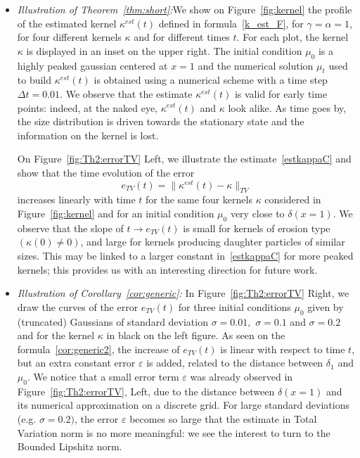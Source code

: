 \documentclass[AHL,Unicode,longabstracts,published]{cedram}
\newcommand*\eps{\varepsilon}
\begin{document}
\begin{itemize}
\item \emph{Illustration of Theorem~\ref{thm:short}:\;}We show on Figure~\ref{fig:kernel} the profile of the estimated kernel $\kappa^{est}(t)$ defined in formula~\eqref{k_est_F}, for $\gamma=\alpha=1$, for four different kernels $\kappa$ and for different times $t$. For each plot, the kernel $\kappa$ is displayed in an inset on the upper right. The initial condition $\mu_0$ is a highly peaked gaussian centered at $x=1$ and the numerical solution $\mu_t$ used to build $\kappa^{est}(t)$ is obtained using a numerical scheme with a time step $\Delta t=0.01$. We observe that the estimate $\kappa^{est}(t)$ is valid for early time points: indeed, at the naked eye, $\kappa^{est}(t)$ and $\kappa$ look alike. As time goes by, the size distribution is driven towards the stationary state and the information on the kernel is lost. 

\noindent On Figure~\ref{fig:Th2:errorTV} Left, we illustrate the estimate~\eqref{estkappaC} and show that the time evolution of the error
\[
e_{TV}(t)=\Big\|\kappa^{est}(t)-\kappa\Big\|_{TV}
\]
increases linearly with time $t$ for the same four kernels $\kappa$ considered in Figure~\ref{fig:kernel} and for an initial condition $\mu_0$ very close to $\delta(x=1)$.
We observe that the slope of $t\to e_{TV}(t)$ is small for kernels of erosion type $(\kappa(0)\neq 0)$, and large for kernels producing daughter particles of similar sizes. This may be linked to a larger constant in~\eqref{estkappaC} for more peaked kernels; this provides us with an interesting direction for future work.

\vspace*{4pt}
\item \emph{Illustration of Corollary~\ref{cor:generic}:\;} In Figure~\ref{fig:Th2:errorTV} Right, we draw the curves of the error $e_{TV}(t)$ for three initial conditions $\mu_0$ given by (truncated) Gaussians of standard deviation $\sigma=0.01,$ $\sigma=0.1$ and $\sigma=0.2$ and for the kernel $\kappa$ in black on the left figure. As seen on the formula~\eqref{cor:generic2}, the increase of $e_{TV}(t)$ is linear with respect to time $t$, but an extra constant error $\eps$ is added, related to the distance between $\delta_1$ and $\mu_0$. We notice that a small error term $\eps$ was already observed in Figure~\ref{fig:Th2:errorTV}, Left, due to the distance between $\delta(x=1)$ and its numerical approximation on a discrete grid. For large standard deviations (e.g. $\sigma=0.2)$, the error $\eps$ becomes so large that the estimate in Total Variation norm is no more meaningful: we see the interest to turn to the Bounded Lipshitz norm.



\end{itemize}
\end{document}
